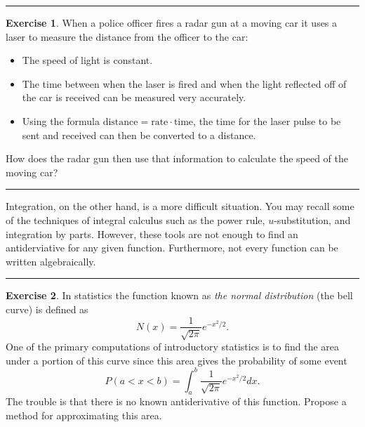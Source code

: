 \documentclass[
]{book}
\theoremstyle{definition}
\theoremstyle{definition}
\theoremstyle{definition}
\newtheorem{exercise}{Exercise}[chapter]
\theoremstyle{remark}
\begin{document}
\begin{center}\rule{0.5\linewidth}{0.5pt}\end{center}

\begin{exercise}
\protect\hypertarget{exr:unnamed-chunk-133}{}{\label{exr:unnamed-chunk-133} }When a police officer fires a radar gun at a moving car it uses a laser
to measure the distance from the officer to the car:

\begin{itemize}
\item
  The speed of light is constant.
\item
  The time between when the laser is fired and when the light
  reflected off of the car is received can be measured very
  accurately.
\item
  Using the formula \(\text{distance} = \text{rate} \cdot \text{time}\),
  the time for the laser pulse to be sent and received can then be
  converted to a distance.
\end{itemize}

How does the radar gun then use that information to calculate the speed
of the moving car?
\end{exercise}

\begin{center}\rule{0.5\linewidth}{0.5pt}\end{center}

Integration, on the other hand, is a more difficult situation. You may
recall some of the techniques of integral calculus such as the power
rule, \(u\)-substitution, and integration by parts. However, these tools
are not enough to find an antiderviative for any given function.
Furthermore, not every function can be written algebraically.

\begin{center}\rule{0.5\linewidth}{0.5pt}\end{center}

\begin{exercise}
\protect\hypertarget{exr:unnamed-chunk-134}{}{\label{exr:unnamed-chunk-134} }In statistics the function known as \emph{the normal distribution} (the bell
curve) is defined as \[N(x) = \frac{1}{\sqrt{2\pi}} e^{-x^2/2}.\] One of
the primary computations of introductory statistics is to find the area
under a portion of this curve since this area gives the probability of
some event
\[P(a < x < b) = \int_a^b \frac{1}{\sqrt{2\pi}} e^{-x^2/2} dx.\] The
trouble is that there is no known antiderivative of this function.
Propose a method for approximating this area.
\end{exercise}
\end{document}
